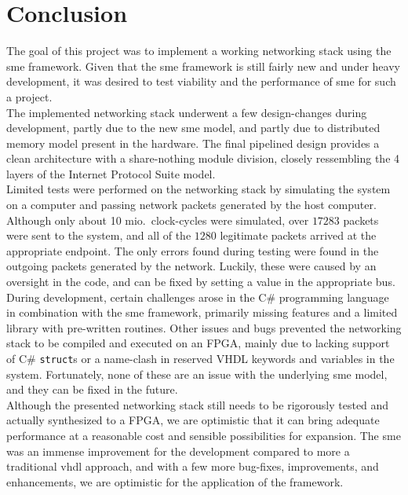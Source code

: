 \chapter{Conclusion}
\label{chap:conclusion}

The goal of this project was to implement a working networking stack using the
\gls{sme} framework. Given that the \gls{sme} framework is still fairly new and
under heavy development, it was desired to test viability and the performance
of \gls{sme} for such a project.\\

The implemented networking stack underwent a few design-changes during
development, partly due to the new \gls{sme} model, and partly due to
distributed memory model present in the hardware. The final pipelined design
provides a clean architecture with a share-nothing module division, closely
ressembling the 4 layers of the Internet Protocol Suite model.\\

Limited tests were performed on the networking stack by simulating the system
on a computer and passing network packets generated by the host computer.
Although only about 10 mio.\ clock-cycles were simulated, over $17283$ packets
were sent to the system, and all of the $1280$ legitimate packets arrived at the
appropriate endpoint. The only errors found during testing were found in the
outgoing packets generated by the network. Luckily, these were caused by an
oversight in the code, and can be fixed by setting a value in the appropriate
bus.\\

During development, certain challenges arose in the C\# programming language in
combination with the \gls{sme} framework, primarily missing features and a limited
library with pre-written routines. Other issues and bugs prevented the
networking stack to be compiled and executed on an FPGA, mainly due to lacking
support of C\# \texttt{struct}s or a name-clash in reserved VHDL keywords and
variables in the system. Fortunately, none of these are an issue with the underlying
\gls{sme} model, and they can be fixed in the future.\\

Although the presented networking stack still needs to be rigorously tested and
actually synthesized to a FPGA, we are optimistic that it can bring adequate
performance at a reasonable cost and sensible possibilities for expansion. The
\gls{sme} was an immense improvement for the development compared to more a
traditional \gls{vhdl} approach, and with a few more bug-fixes, improvements,
and enhancements, we are optimistic for the application of the framework.

